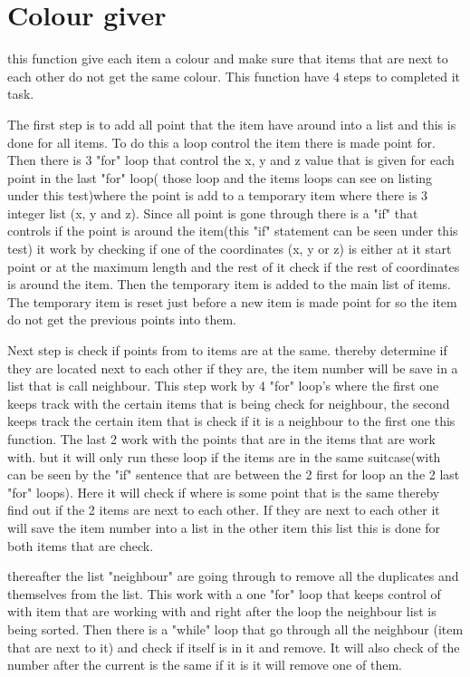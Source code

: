 \section{Colour giver}
this function give each item a colour and make sure that items that are next to each other do not get the same colour. This function have 4 steps to completed it task.

The first step is to add all point that the item have around into a list and this is done for all items. To do this a loop control the item there is made point for. Then there is 3 "for" loop that control the x, y and z value that is given for each point in the last "for" loop( those loop and the items loops can see on listing under this test)where the point is add to a temporary item where there is 3 integer list (x, y and z).
Since all point is gone through there is a "if" that controls if the point is around the item(this "if" statement can be seen under this test) it work by checking if one of the coordinates (x, y or z) is either at it start point or at the maximum length and the rest of it check if the rest of coordinates is around the item. Then the temporary item is added to the main list of items.  The temporary item is reset just before a new item is made point for so the item do not get the previous points into them.

Next step is check if points from to items are at the same. thereby determine if they are located next to each other if they are, the item number will be save in a list that is call neighbour. This step work by 4 "for" loop's where the first one keeps track with the certain items that is being check for neighbour, the second keeps track  the certain item that is check if it is a neighbour to the first one this function. The last 2 work with the points that are in the items that are work with. but it will only run these loop if the items are in the same suitcase(with can be seen by the "if" sentence that are between the 2 first for loop an the 2 last "for" loops). Here it will check if where is some point that is the same thereby find out if the 2 items are next to each other. If they are next to each other it will save the item number into a list in the other item this list this is done for both items that are check.


thereafter the list "neighbour" are going through to remove all the duplicates and themselves from the list. This work with a one "for" loop that keeps control of with item that are working with and right after the loop the neighbour list is being sorted. Then there is a "while" loop that go through all the neighbour (item that are next to it) and check if itself is in it and remove. It will also check of the number after the current is the same if it is it will remove one of them.


